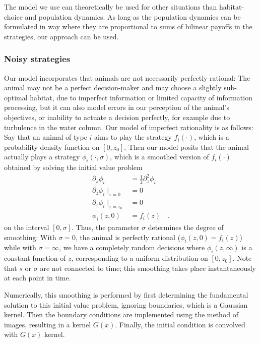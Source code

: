 The model we use can theoretically be used for other situations than habitat-choice and population dynamics. As long as the population dynamics can be formulated in way where they are proportional to sums of bilinear payoffs in the strategies, our approach can be used.



\subsubsection{Noisy strategies}
Our model incorporates that animals are not necessarily perfectly rational: The animal may not be a perfect decision-maker and may choose a slightly sub-optimal habitat, due to imperfect information or limited capacity of information processing, but it can also model errors in our perception of the animal's objectives, or inability to actuate a decision perfectly, for example due to turbulence in the water column. Our model of imperfect rationality is as follows: Say that an animal of type $i$ aims to play the strategy $f_i(\cdot)$, which is a probability density function on $[0,z_0]$. Then our model posits that the animal actually plays a strategy $\phi_i(\cdot ,\sigma)$, which is a smoothed version of $f_i(\cdot)$ obtained by solving the initial value problem
\begin{equation}
  \begin{split}
  \label{eq:density_PDE}
  \partial_s \phi_i &= \frac{1}{2}\partial_z^2 \phi_i \\
  \partial_z \phi_i \mid_{z=0} &= 0 \\
  \partial_z \phi_i \mid_{z = z_0} &= 0 \\
   \phi_i(z,0) &= f_i(z) \quad .
 \end{split}
\end{equation}
on the interval $[0,\sigma]$. Thus, the parameter $\sigma$ determines the degree of smoothing: With $\sigma=0$, the animal is perfectly rational ($\phi_i(z,0)=f_i(z)$) while with $\sigma=\infty$, we have a completely random decisions where $\phi_i(z,\infty)$ is a constant function of $z$, corresponding to a uniform distribution on $[0,z_0]$. Note that $s$ or $\sigma$ are not connected to time; this smoothing takes place instantaneously at each point in time.

Numerically, this smoothing is performed by first determining the fundamental solution to this initial value problem, ignoring boundaries, which is a Gaussian kernel. Then the boundary conditions are implemented using the method of images, resulting in a kernel $G(x)$. Finally, the initial condition is convolved with $G(x)$ kernel.


